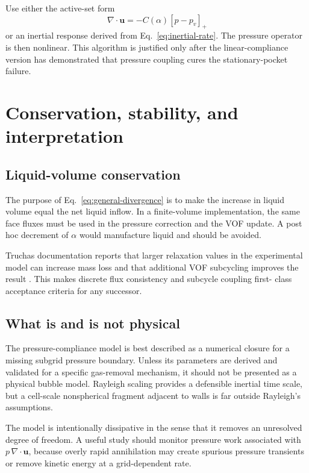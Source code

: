 \documentclass[11pt]{article}
\newcommand{\pos}[1]{\left[#1\right]_+}
\newcommand{\divg}{\nabla\!\cdot}
\newcommand{\uv}{\boldsymbol{u}}
\begin{document}
Use either the active-set form
\begin{equation}
  \divg\uv=-C(\alpha)\pos{p-p_v}
\end{equation}
or an inertial response derived from Eq.~\eqref{eq:inertial-rate}.  The pressure operator
is then nonlinear.  This algorithm is justified only after the linear-compliance version
has demonstrated that pressure coupling cures the stationary-pocket failure.

\section{Conservation, stability, and interpretation}

\subsection{Liquid-volume conservation}

The purpose of Eq.~\eqref{eq:general-divergence} is to make the increase in liquid volume
equal the net liquid inflow.  In a finite-volume implementation, the same face fluxes must
be used in the pressure correction and the VOF update.  A post hoc decrement of
\(\alpha\) would manufacture liquid and should be avoided.

Truchas documentation reports that larger relaxation values in the experimental model
can increase mass loss and that additional VOF subcycling improves the result
\cite{truchas-manual}.  This makes discrete flux consistency and subcycle coupling first-
class acceptance criteria for any successor.

\subsection{What is and is not physical}

The pressure-compliance model is best described as a numerical closure for a missing
subgrid pressure boundary.  Unless its parameters are derived and validated for a
specific gas-removal mechanism, it should not be presented as a physical bubble model.
Rayleigh scaling provides a defensible inertial time scale, but a cell-scale nonspherical
fragment adjacent to walls is far outside Rayleigh's assumptions.

The model is intentionally dissipative in the sense that it removes an unresolved degree
of freedom.  A useful study should monitor pressure work associated with
\(p\,\divg\uv\), because overly rapid annihilation may create spurious pressure transients
or remove kinetic energy at a grid-dependent rate.
\end{document}

